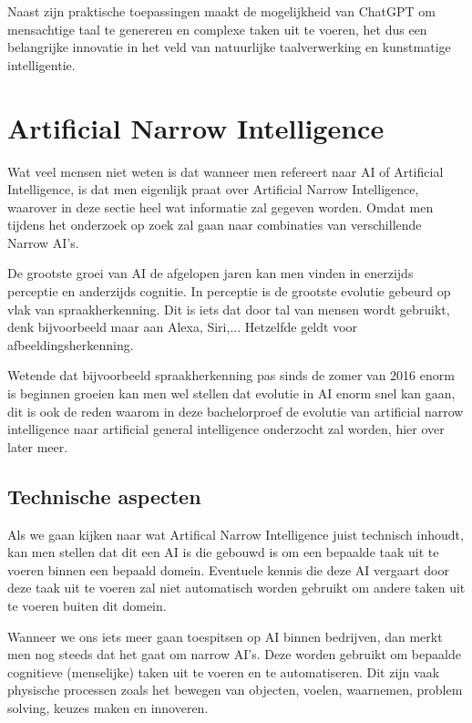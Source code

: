 Naast zijn praktische toepassingen maakt de mogelijkheid van ChatGPT om mensachtige taal te genereren en complexe taken uit te voeren, het dus een belangrijke innovatie in het veld van natuurlijke taalverwerking en kunstmatige intelligentie.

\cite{lund2023chatting}

\section{Artificial Narrow Intelligence}

Wat veel mensen niet weten is dat wanneer men refereert naar AI of Artificial Intelligence, is dat men eigenlijk praat over Artificial Narrow Intelligence, waarover in deze sectie heel wat informatie zal gegeven worden. Omdat men tijdens het onderzoek op zoek zal gaan naar combinaties van verschillende Narrow AI's.

De grootste groei van AI de afgelopen jaren kan men vinden in enerzijds perceptie en anderzijds cognitie. In perceptie is de grootste evolutie gebeurd op vlak van spraakherkenning. Dit is iets dat door tal van mensen wordt gebruikt, denk bijvoorbeeld maar aan Alexa, Siri,... Hetzelfde geldt voor afbeeldingsherkenning.

Wetende dat bijvoorbeeld spraakherkenning pas sinds de zomer van 2016 enorm is beginnen groeien kan men wel stellen dat evolutie in AI enorm snel kan gaan, dit is ook de reden waarom in deze bachelorproef de evolutie van artificial narrow intelligence naar artificial general intelligence onderzocht zal worden, hier over later meer. \autocite{brynjolfsson2017artificial}

\subsection{Technische aspecten}

Als we gaan kijken naar wat Artifical Narrow Intelligence juist technisch inhoudt, kan men stellen dat dit een AI is die gebouwd is om een bepaalde taak uit te voeren binnen een bepaald domein. Eventuele kennis die deze AI vergaart door deze taak uit te voeren zal niet automatisch worden gebruikt om andere taken uit te voeren buiten dit domein. 

Wanneer we ons iets meer gaan toespitsen op AI binnen bedrijven, dan merkt men nog steeds dat het gaat om narrow AI’s. Deze worden gebruikt om bepaalde cognitieve (menselijke) taken uit te voeren en te automatiseren. Dit zijn vaak physische processen zoals het bewegen van objecten, voelen, waarnemen, problem solving, keuzes maken en innoveren. 

